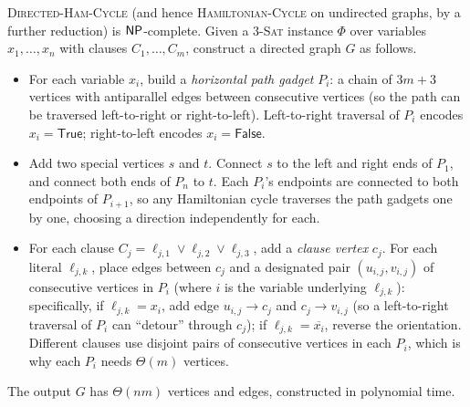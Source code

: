 \begin{theorem}
\label{thm:3sat_to_dhc}
\textsc{Directed-Ham-Cycle} (and hence \textsc{Hamiltonian-Cycle} on undirected graphs, by a further reduction) is $\mathsf{NP}$-complete. Given a $3$-\textsc{Sat} instance $\Phi$ over variables $x_1, \dots, x_n$ with clauses $C_1, \dots, C_m$, construct a directed graph $G$ as follows.
\begin{itemize}
  \item For each variable $x_i$, build a \emph{horizontal path gadget} $P_i$: a chain of $3m + 3$ vertices with antiparallel edges between consecutive vertices (so the path can be traversed left-to-right or right-to-left). Left-to-right traversal of $P_i$ encodes $x_i = \mathsf{True}$; right-to-left encodes $x_i = \mathsf{False}$.
  \item Add two special vertices $s$ and $t$. Connect $s$ to the left and right ends of $P_1$, and connect both ends of $P_n$ to $t$. Each $P_i$'s endpoints are connected to both endpoints of $P_{i+1}$, so any Hamiltonian cycle traverses the path gadgets one by one, choosing a direction independently for each.
  \item For each clause $C_j = \ell_{j,1} \vee \ell_{j,2} \vee \ell_{j,3}$, add a \emph{clause vertex} $c_j$. For each literal $\ell_{j,k}$, place edges between $c_j$ and a designated pair $(u_{i,j}, v_{i,j})$ of consecutive vertices in $P_i$ (where $i$ is the variable underlying $\ell_{j,k}$): specifically, if $\ell_{j,k} = x_i$, add edge $u_{i,j} \to c_j$ and $c_j \to v_{i,j}$ (so a left-to-right traversal of $P_i$ can ``detour'' through $c_j$); if $\ell_{j,k} = \overline{x_i}$, reverse the orientation. Different clauses use disjoint pairs of consecutive vertices in each $P_i$, which is why each $P_i$ needs $\Theta(m)$ vertices.
\end{itemize}
The output $G$ has $\Theta(nm)$ vertices and edges, constructed in polynomial time.
\end{theorem}

